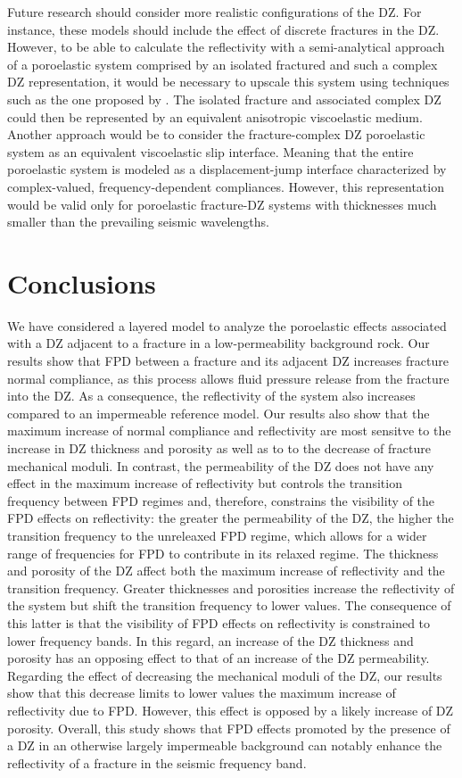 \documentclass[draft]{agujournal2019}
\begin{document}
Future research should consider more realistic configurations of the DZ. For instance, these models should include the effect of discrete fractures in the DZ. However, to be able to calculate the reflectivity  with a semi-analytical approach of a poroelastic system comprised by an isolated fractured and such a complex DZ representation, it would be necessary to upscale this system using techniques such as the one proposed by . The isolated fracture and associated complex DZ could then be represented by an equivalent anisotropic viscoelastic medium. Another approach would be to consider the fracture-complex DZ poroelastic system as an equivalent viscoelastic slip interface. Meaning that the entire poroelastic system is modeled as a displacement-jump interface characterized by complex-valued, frequency-dependent compliances.
However, this representation would be valid only for poroelastic fracture-DZ systems with thicknesses much smaller than the prevailing seismic wavelengths.


\section{Conclusions}
We have considered a layered model to analyze the poroelastic effects associated with a DZ adjacent to a fracture  in a low-permeability background rock.
Our results show that FPD between a fracture and its adjacent DZ increases fracture normal compliance, as this process allows fluid pressure release from the fracture into the DZ.
As a consequence, the reflectivity of the system also increases compared to an impermeable reference model. 
Our results also show that the maximum  increase of normal compliance  and reflectivity are most sensitve to the increase in DZ thickness and porosity as well as to to the decrease of fracture mechanical moduli. In contrast, the permeability of the DZ does not have any effect in the maximum increase of reflectivity but controls the transition frequency between FPD regimes and, therefore, constrains the visibility of the FPD effects on reflectivity: the greater the permeability of the DZ, the higher the transition frequency to the unreleaxed FPD regime, which allows  for a wider range of frequencies for FPD to contribute in its relaxed regime. The thickness and porosity of the DZ affect both the maximum increase of reflectivity and the transition frequency. Greater thicknesses and porosities increase the reflectivity of the system but shift the transition frequency to lower values. The consequence of this latter is that the visibility of FPD effects on  reflectivity is constrained to lower frequency bands. In this regard, an increase of the DZ thickness and porosity has an opposing effect to that of an increase of the DZ permeability.
Regarding the effect of decreasing the mechanical moduli of the DZ, our results show that this decrease limits to lower values the maximum increase of reflectivity due to FPD. However, this effect is opposed by a likely increase of DZ porosity.
Overall, this study shows that FPD effects promoted by the presence of a DZ in an otherwise largely impermeable background can  notably enhance the reflectivity of a fracture in the seismic frequency band.
\end{document}
